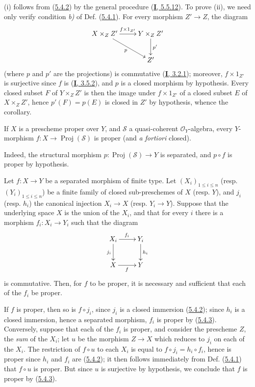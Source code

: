 (i) follows from (\hyperref[II.5.4.2]{5.4.2}) by the general procedure
(\hyperref[I.5.5.12]{\textbf{I}, 5.5.12}). To prove (ii), we need only
verify condition \emph{b)} of Def. (\hyperref[II.5.4.1]{5.4.1}).
For every morphism $Z'\to Z$, the diagram
\[
  \xymatrix{
    X\times_ZZ'\ar[r]^{f\times1_{Z'}}\ar[dr]_p &
    Y\times_ZZ'\ar[d]^{p'}\\
    & Z'
  }
\]
(where $p$ and $p'$ are the projections) is commutative
(\hyperref[I.3.2.1]{\textbf{I}, 3.2.1}); moreover, $f\times1_{Z'}$ is surjective
since $f$ is (\hyperref[I.3.5.2]{\textbf{I}, 3.5.2}), and $p$ is
a closed morphism by hypothesis. Every closed subset $F$ of
$Y\times_ZZ'$ is then the image under $f\times1_{Z'}$ of a closed subset $E$
of $X\times_ZZ'$, hence $p'(F)=p(E)$ is closed in $Z'$ by hypothesis, whence
the corollary.

\begin{corollary}[5.4.4]
\label{II.5.4.4}
If $X$ is a prescheme proper over $Y$, and $\mathcal{S}$ a
quasi-coherent $\mathcal{O}_Y$-algebra, every $Y$-morphism
$f:X\to\operatorname{Proj}(\mathcal{S})$ is proper (and \emph{a fortiori}
closed).
\end{corollary}

Indeed, the structural morphism
$p:\operatorname{Proj}(\mathcal{S})\to Y$ is separated, and $p\circ f$ is
proper by hypothesis.

\begin{corollary}[5.4.5]
\label{II.5.4.5}
Let $f:X\to Y$ be a separated morphism of finite type. Let
$(X_i)_{1\leq i\leq n}$ \textup{(resp. $(Y_i)_{1\leq i\leq n}$)} be a finite family
of closed sub-preschemes of $X$ \textup{(resp. $Y$)}, and $j_i$ \textup{(resp. $h_i$)}
the canonical injection $X_i\to X$ \textup{(resp. $Y_i\to Y$)}. Suppose that the
underlying space $X$ is the union of the $X_i$, and that for every $i$ there
is a morphism $f_i:X_i\to Y_i$ such that the diagram
\[
  \xymatrix{
    X_i\ar[r]^{f_i}\ar[d]_{j_i} & Y_i\ar[d]^{h_i}\\
    X\ar[r]_f & Y
  }
\]
is commutative. Then, for $f$ to be proper, it is necessary and sufficient
that each of the $f_i$ be proper.
\end{corollary}


If $f$ is proper, then so is $f\circ j_i$, since $j_i$ is a
closed immersion (\hyperref[II.5.4.2]{5.4.2}); since $h_i$ is a
closed immersion, hence a separated morphism, $f_i$ is proper by
(\hyperref[II.5.4.3]{5.4.3}). Conversely, suppose that each of the $f_i$
is proper, and consider the prescheme $Z$, the \emph{sum} of the $X_i$; let $u$ be
the morphism $Z\to X$ which reduces to $j_i$ on each of the $X_i$. The
restriction of $f\circ u$ to each $X_i$ is equal to
$f\circ j_i=h_i\circ f_i$, hence is proper since $h_i$
and $f_i$ are (\hyperref[II.5.4.2]{5.4.2}); it then follows immediately
from Def. (\hyperref[II.5.4.1]{5.4.1}) that $f\circ u$ is proper. But
since $u$ is surjective by hypothesis, we conclude that $f$ is proper by
(\hyperref[II.5.4.3]{5.4.3}).


